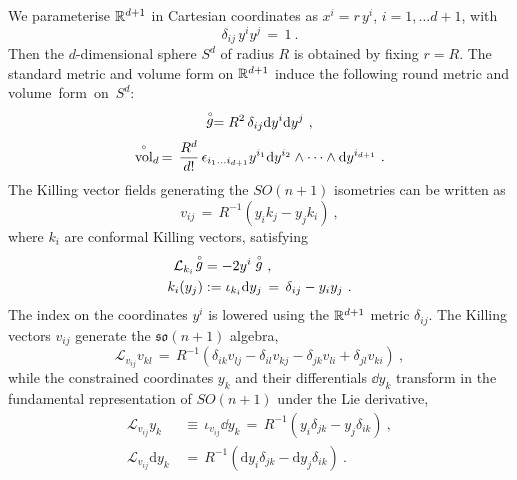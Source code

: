 \documentclass[debug]{phd}
\begin{document}
				We parameterise $\mathbb{R}^{d+1}$ in Cartesian coordinates as $x^i = r\, y^i$, $i=1,\ldots d+1$, with 
					\begin{equation}
						\delta_{ij}\,y^iy^j \,=\, 1\ .
					\end{equation}
				Then the $d$-dimensional sphere $S^d$ of radius $R$ is obtained by fixing $r=R$. 
				The standard metric and volume form on $\mathbb{R}^{d+1}$ induce the following round metric and \hbox{volume form on $S^d$:}
					\begin{equation}\label{roundSdmetric}
						\rg{g} = R^2 \, \delta_{ij}\dd y^i \dd y^j \ ,
					\end{equation}
					\begin{equation}
						\stackrel{\scriptscriptstyle{\circ}}{\rm vol}_{d} \, = \, \frac{R^d}{d!} \,\epsilon_{i_1 \ldots i_{d+1}} y^{i_1} \mathrm{d} y^{i_2}\wedge \cdots \wedge \mathrm{d} y^{i_{d+1}}\ .
					\end{equation}
				The Killing vector fields generating the $SO(n+1)$ isometries can be written as 
						\begin{equation}
							v_{ij} \,=\, R^{-1}\left(y_i k_j - y_j k_i \right)\ ,
						\end{equation}
				where $k_i$ are conformal Killing vectors, satisfying 
						\begin{align}
							\mathcal{L}_{k_i}\! \stackrel{\scriptscriptstyle{\circ}}{g} &= - 2 y^i \stackrel{\scriptscriptstyle{\circ}}{g}\ , \\
										k_i (y_j) &:= \iota_{k_i}\mathrm{d} y_j \, = \, \delta_{ij} - y_i y_j\ .
						\end{align}
				The index on the coordinates $y^i$ is lowered using the $\mathbb{R}^{d+1}$ metric $\delta_{ij}$.
				The Killing vectors $v_{ij}$ generate the $\mathfrak{so}(n+1)$ algebra,
						\begin{equation}\label{algebra_Killing_v}
							\mathcal{L}_{ v_{ij}} v_{kl} \, =\, R^{-1}\left(\delta_{ik}v_{lj} - \delta_{il}v_{kj} - \delta_{jk}v_{li} + \delta_{jl} v_{ki} \right)\ ,
						\end{equation}
				while the constrained coordinates $y_k$ and their differentials $\dd y_k$ transform in the fundamental representation of $SO(n+1)$ under the Lie derivative, 
						\begin{equation}\label{Lie_on_y}
						\begin{split}
							\mathcal{L}_{v_{ij}}y_k \,&\equiv\, \iota_{v_{ij}}\dd y_k \,=\, R^{-1}\left( y_i \delta_{jk} -  y_j\delta_{ik}\right)\ , \\[1mm]
							\mathcal{L}_{v_{ij}} \mathrm{d} y_k \, &=\,  R^{-1}\left(\mathrm{d}y_i \delta_{jk} - \mathrm{d}y_j\delta_{ik}\right) \ .
						\end{split}
						\end{equation}
\end{document}
